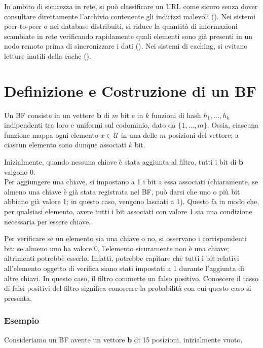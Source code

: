 In ambito di sicurezza in rete, si può classificare un URL come sicuro senza dover consultare direttamente l'archivio contenente gli indirizzi malevoli (\cite{patgiri2021deepbf}).
Nei sistemi peer-to-peer o nei database distribuiti, si riduce la quantità di informazioni scambiate in rete verificando rapidamente quali elementi sono già presenti in un nodo remoto prima di sincronizzare i dati (\cite{broder2004network}). Nei sistemi di caching, si evitano letture inutili della cache (\cite{maggs2015algorithmic}).

\section{Definizione e Costruzione di un BF}

Un BF consiste in un vettore $\mathbf{b}$ di $m$ bit e in $k$ funzioni di hash $h_1, \dots, h_k$ indipendenti tra loro e uniformi sul codominio, dato da $\{1, \dots, m\}$. Ossia, ciascuna funzione mappa ogni elemento $x \in \mathcal{U}$ in una delle $m$ posizioni del vettore; a ciascun elemento sono dunque associati $k$ bit.

Inizialmente, quando nessuna chiave è stata aggiunta al filtro, tutti i bit di $\mathbf{b}$ valgono 0. \\
Per aggiungere una chiave, si impostano a 1 i bit a essa associati (chiaramente, se almeno una chiave è già stata registrata nel BF, può darsi che uno o più bit abbiano già valore 1; in questo caso, vengono lasciati a 1). Questo fa in modo che, per qualsiasi elemento, avere tutti i bit associati con valore 1 sia una condizione necessaria per essere chiave.

Per verificare se un elemento sia una chiave o no, si osservano i corrispondenti bit: se almeno uno ha valore 0, l'elemento sicuramente non è una chiave; altrimenti potrebbe esserlo. Infatti, potrebbe capitare che tutti i bit relativi all'elemento oggetto di verifica siano stati impostati a 1 durante l'aggiunta di altre chiavi. In questo caso, il filtro commette un falso positivo. Conoscere il tasso di falsi positivi del filtro significa conoscere la probabilità con cui questo caso si presenta.

\subsubsection{Esempio}
Consideriamo un BF avente un vettore $\mathbf{b}$ di 15 posizioni, inizialmente vuoto.

\begin{center}
\end{center}


